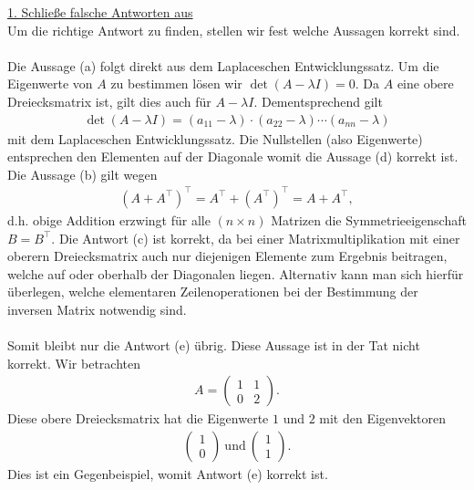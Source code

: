 \underline{1. Schließe falsche Antworten aus}\\
Um die richtige Antwort zu finden, stellen wir fest welche Aussagen korrekt sind.\\
\\
Die Aussage (a) folgt direkt aus dem Laplaceschen Entwicklungssatz. Um die Eigenwerte von $A$ zu bestimmen lösen wir $\det(A - \lambda I) = 0$. Da $A$ eine obere Dreiecksmatrix ist, gilt dies auch für $A - \lambda I$. Dementsprechend gilt
\begin{align*}
	\det(A - \lambda I)
	=(a_{11} - \lambda) \cdot (a_{22} - \lambda) \cdots (a_{nn} - \lambda)
\end{align*}
mit dem Laplaceschen Entwicklungssatz. Die Nullstellen (also Eigenwerte) entsprechen den Elementen auf der Diagonale womit die Aussage (d) korrekt ist.
Die Aussage (b) gilt wegen
\begin{align*}
	(A + A^\top)^\top 
	= A^\top + \left( A^\top \right)^\top  
	= A + A^\top,
\end{align*}
d.h. obige Addition erzwingt für alle $(n \times n)$ Matrizen die Symmetrieeigenschaft $B = B^\top$.
Die Antwort (c) ist korrekt, da bei einer Matrixmultiplikation mit einer oberern Dreiecksmatrix auch nur diejenigen Elemente zum Ergebnis beitragen, welche auf oder oberhalb der Diagonalen liegen. Alternativ kann man sich hierfür überlegen, welche elementaren Zeilenoperationen bei der Bestimmung der inversen Matrix notwendig sind.\\
\\
Somit bleibt nur die Antwort (e) übrig. Diese Aussage ist in der Tat nicht korrekt.
Wir betrachten
\begin{align*}
	A =
	\begin{pmatrix}
		1 & 1 \\
		0 & 2
	\end{pmatrix}.
\end{align*}
Diese obere Dreiecksmatrix hat die Eigenwerte $1$ und $2$ mit den Eigenvektoren
\begin{align*}
	\begin{pmatrix}
		1\\
		0
	\end{pmatrix}
	\ \text{und} \
	\begin{pmatrix}
		1\\
		1
	\end{pmatrix}.
\end{align*}
Dies ist ein Gegenbeispiel, womit Antwort (e) korrekt ist.
